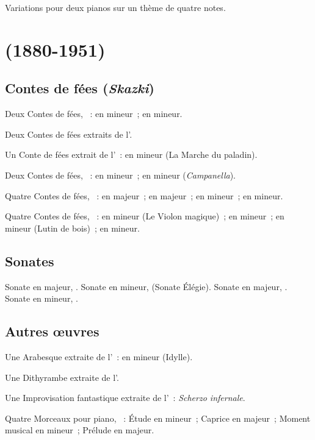 Variations pour deux pianos sur un thème de quatre notes.

\section[%
Nikolaj Metner (1880-1951)]{%
\NMedtner{} (1880-1951)}

\subsection{Contes de fées (\emph{Skazki})}

Deux Contes de fées, ~:  en \kC mineur~;  en \kC
mineur.

Deux Contes de fées extraits de l'.

Un Conte de fées extrait de l'~:  en \kE mineur (La
Marche du paladin).

Deux Contes de fées, ~:  en \kB \Flat mineur~; 
en \kB mineur (\emph{Campanella}).

Quatre Contes de fées, ~:  en \kE \Flat majeur~;
 en \kE \Flat majeur~;  en \kF mineur~;  en
\kF \Sharp mineur.

Quatre Contes de fées, ~:  en \kB mineur (Le Violon
magique)~;  en \kE mineur~;  en \kA mineur (Lutin de
bois)~;  en \kD mineur.

\subsection{Sonates}

Sonate en \kA \Flat majeur,  .
Sonate en \kD mineur,   (Sonate Élégie).
Sonate en \kC majeur,  .
Sonate en \kG mineur, .

\subsection{Autres œuvres}

Une Arabesque extraite de l'~:  en \kB mineur (Idylle).

Une Dithyrambe extraite de l'.

Une Improvisation fantastique extraite de l'~: 
\emph{Scherzo infernale}.

Quatre Morceaux pour piano, ~:  Étude en \kG \Sharp
mineur~;  Caprice en \kC majeur~;  Moment musical en \kC
mineur~;  Prélude en \kE \Flat majeur.

